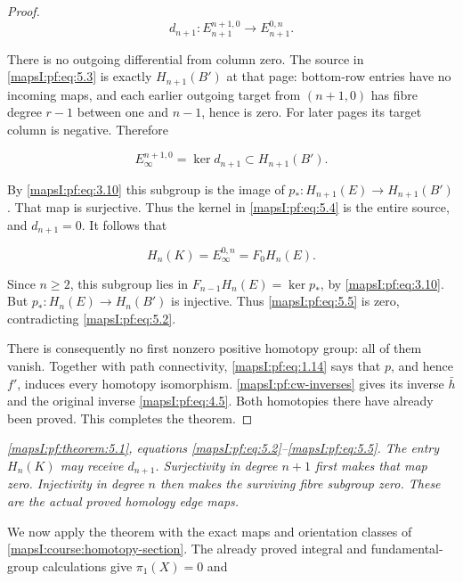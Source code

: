 \begin{proof}
\begin{equation}
d_{n+1}:E_{n+1}^{n+1,0}\longrightarrow E_{n+1}^{0,n}.
\label{mapsI:pf:eq:5.3}
\end{equation}

There is no outgoing differential from column zero. The source in \eqref{mapsI:pf:eq:5.3} is exactly \(H_{n+1}(B')\) at that page: bottom-row entries have no incoming maps, and each earlier outgoing target from \((n+1,0)\) has fibre degree \(r-1\) between one and \(n-1\), hence is zero. For later pages its target column is negative. Therefore

\begin{equation}
E_\infty^{n+1,0}=\ker d_{n+1}\subset H_{n+1}(B').
\label{mapsI:pf:eq:5.4}
\end{equation}

By \eqref{mapsI:pf:eq:3.10} this subgroup is the image of \(p_*:H_{n+1}(E)\to H_{n+1}(B')\). That map is surjective. Thus the kernel in \eqref{mapsI:pf:eq:5.4} is the entire source, and \(d_{n+1}=0\). It follows that

\begin{equation}
H_n(K)=E_\infty^{0,n}=F_0H_n(E).
\label{mapsI:pf:eq:5.5}
\end{equation}

Since \(n\geq2\), this subgroup lies in \(F_{n-1}H_n(E)=\ker p_*\), by \eqref{mapsI:pf:eq:3.10}. But \(p_*:H_n(E)\to H_n(B')\) is injective. Thus \eqref{mapsI:pf:eq:5.5} is zero, contradicting \eqref{mapsI:pf:eq:5.2}.

There is consequently no first nonzero positive homotopy group: all of them vanish. Together with path connectivity, \eqref{mapsI:pf:eq:1.14} says that \(p\), and hence \(f'\), induces every homotopy isomorphism. \cref{mapsI:pf:cw-inverses} gives its inverse \(\bar h\) and the original inverse \eqref{mapsI:pf:eq:4.5}. Both homotopies there have already been proved. This completes the theorem.
\end{proof}

\emph{\cref{mapsI:pf:theorem:5.1}, equations \eqref{mapsI:pf:eq:5.2}--\eqref{mapsI:pf:eq:5.5}. The entry \(H_n(K)\) may receive \(d_{n+1}\). Surjectivity in degree \(n+1\) first makes that map zero. Injectivity in degree \(n\) then makes the surviving fibre subgroup zero. These are the actual proved homology edge maps.}

We now apply the theorem with the exact maps and orientation classes of \cref{mapsI:course:homotopy-section}. The already proved integral and fundamental-group calculations give \(\pi_1(X)=0\) and

